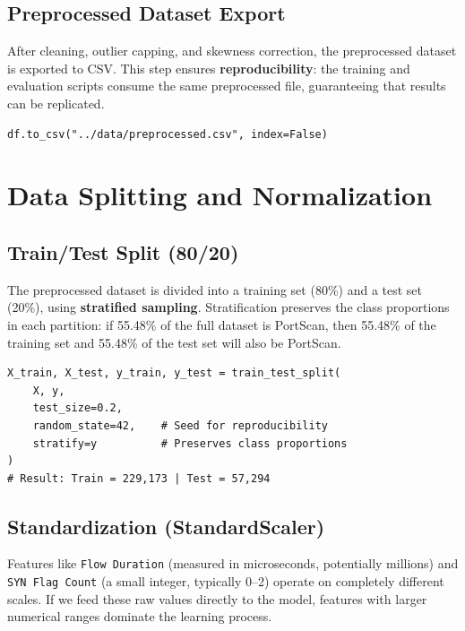 \subsection{Preprocessed Dataset Export}

After cleaning, outlier capping, and skewness correction, the preprocessed dataset is exported to CSV. This step ensures \textbf{reproducibility}: the training and evaluation scripts consume the same preprocessed file, guaranteeing that results can be replicated.

\begin{lstlisting}[caption={Exporting the preprocessed dataset}]
df.to_csv("../data/preprocessed.csv", index=False)
\end{lstlisting}

\section{Data Splitting and Normalization}

\subsection{Train/Test Split (80/20)}

The preprocessed dataset is divided into a training set (80\%) and a test set (20\%), using \textbf{stratified sampling}. Stratification preserves the class proportions in each partition: if 55.48\% of the full dataset is PortScan, then 55.48\% of the training set and 55.48\% of the test set will also be PortScan.

\begin{lstlisting}[caption={Stratified dataset splitting}]
X_train, X_test, y_train, y_test = train_test_split(
    X, y,
    test_size=0.2,
    random_state=42,    # Seed for reproducibility
    stratify=y          # Preserves class proportions
)
# Result: Train = 229,173 | Test = 57,294
\end{lstlisting}

\subsection{Standardization (StandardScaler)}
\label{sec:standardscaler}

Features like \texttt{Flow Duration} (measured in microseconds, potentially millions) and \texttt{SYN Flag Count} (a small integer, typically 0--2) operate on completely different scales. If we feed these raw values directly to the model, features with larger numerical ranges dominate the learning process.

